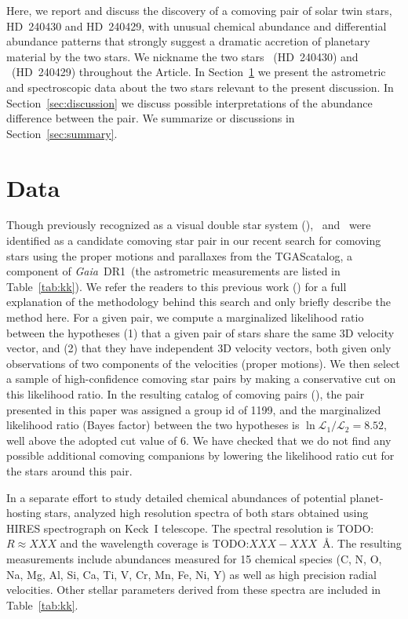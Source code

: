 \documentclass[manuscript]{aastex6}
\newcommand{\project}[1]{\textsl{#1}}
\newcommand{\acronym}[1]{{\small{#1}}}
\newcommand{\gaia}{\project{Gaia}}
\newcommand{\documentname}{Article}
\newcommand{\sectionname}{Section}
\newcommand{\dr}{\acronym{DR1}}
\newcommand{\tgas}{\acronym{TGAS}}
\newcommand{\sunanalog}{\text{Krios}}
\newcommand{\bizarreone}{\text{Kronos}}
\newcommand{\todo}[1]{{\color{blue}TODO:#1}}
\renewcommand\tablename{Table}
\begin{document}
Here, we report and discuss the discovery of a comoving pair of solar twin stars,
HD~240430 and HD~240429, with unusual chemical abundance and differential abundance patterns
that strongly suggest a dramatic accretion of planetary material by the two stars.
We nickname the two stars \bizarreone\ (HD~240430) and
\sunanalog\ (HD~240429) throughout the \documentname.
In \sectionname~\ref{sec:data} we present the astrometric and spectroscopic data
about the two stars relevant to the present discussion.
In \sectionname~\ref{sec:discussion} we discuss possible interpretations of
the abundance difference between the pair.
We summarize or discussions in \sectionname~\ref{sec:summary}.


\section{Data}
\label{sec:data}



Though previously recognized as a visual double star system
(\citealt{2001AJ....122.3466M}), \sunanalog\ and \bizarreone\ were identified as a
candidate comoving star pair in our recent search for comoving stars using the
proper motions and parallaxes from the \tgas catalog, a component of \gaia\ \dr\
(the astrometric measurements are listed in \tablename~\ref{tab:kk}).
We refer the readers to this previous work (\citealt{2016arXiv161202440O}) for a
full explanation of the methodology behind this search and only briefly describe
the method here.
For a given pair, we compute a marginalized likelihood ratio between the
hypotheses (1) that a given pair of stars share the same 3D velocity vector, and
(2) that they have independent 3D velocity vectors, both given only observations
of two components of the velocities (proper motions).
We then select a sample of high-confidence comoving star pairs by making a
conservative cut on this likelihood ratio.
In the resulting catalog of comoving pairs (\citealt{2016arXiv161202440O}),
the pair presented in this paper was assigned a group id of 1199,
and the marginalized likelihood ratio (Bayes factor)
between the two hypotheses is $\ln{\mathcal{L}_1/\mathcal{L}_2} = 8.52$,
well above the adopted cut value of 6.
We have checked that we do not find any possible additional comoving companions
by lowering the likelihood ratio cut for the stars around this pair.

In a separate effort to study detailed chemical abundances of
potential planet-hosting stars, \citet{2016ApJS..225...32B}
analyzed high resolution spectra of both stars obtained using HIRES spectrograph
on Keck~I telescope.
The spectral resolution is \todo{$R\approx XXX$} and the wavelength coverage is \todo{$XXX-XXX$~\AA}.
The resulting measurements include abundances measured for 15
chemical species (C, N, O, Na, Mg, Al, Si, Ca, Ti, V, Cr, Mn, Fe, Ni, Y) as
well as high precision radial velocities.
Other stellar parameters derived from these spectra are included in
\tablename~\ref{tab:kk}.
\end{document}

